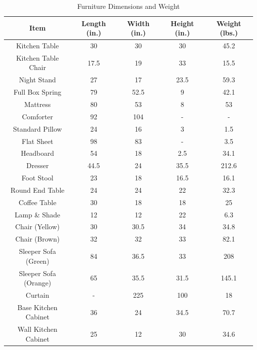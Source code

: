\documentclass{article}
\begin{document}
\renewcommand{\arraystretch}{1.5}
\begin{table}[H]
	\centering
	\caption{Furniture Dimensions and Weight}
		\begin{tabular}[c]{|c|c|c|c|c|}
			\hline
			\textbf{Item} & \textbf{Length (in.)} & \textbf{Width (in.)} & \textbf{Height (in.)} & \textbf{Weight (lbs.)} \\ \hline \hline
			Kitchen Table & 30 & 30 & 30 & 45.2 \\ \hline
			Kitchen Table Chair & 17.5 & 19 & 33 & 15.5 \\ \hline
			Night Stand & 27 & 17 & 23.5 & 59.3 \\ \hline
			Full Box Spring & 79 & 52.5 & 9 & 42.1 \\ \hline
			Mattress & 80 & 53 & 8 & 53 \\ \hline
			Comforter & 92 & 104 & - & - \\ \hline
			Standard Pillow & 24 & 16 & 3 & 1.5 \\ \hline
			Flat Sheet & 98 & 83 & - & 3.5 \\ \hline
			Headboard & 54 & 18 & 2.5 & 34.1 \\ \hline
			Dresser & 44.5 & 24 & 35.5 & 212.6 \\ \hline
			Foot Stool & 23 & 18 & 16.5 & 16.1 \\ \hline
			Round End Table & 24 & 24 & 22 & 32.3 \\ \hline
			Coffee Table & 30 & 18 & 18 & 25 \\ \hline
			Lamp \& Shade & 12 & 12 & 22 & 6.3 \\ \hline
			Chair (Yellow) & 30 & 30.5 & 34 & 34.8 \\ \hline
			Chair (Brown) & 32 & 32 & 33 & 82.1 \\ \hline
			Sleeper Sofa (Green) & 84 & 36.5 & 33 & 208 \\ \hline
			Sleeper Sofa (Orange) & 65 &35.5 & 31.5 & 145.1 \\ \hline
			Curtain & - & 225 & 100 & 18 \\ \hline	
			Base Kitchen Cabinet & 36 & 24 & 34.5 & 70.7 \\ \hline
			Wall Kitchen Cabinet & 25 & 12 & 30 & 34.6 \\ \hline
		\end{tabular}
	\label{FurnitureTable}
\end{table}
\end{document}
